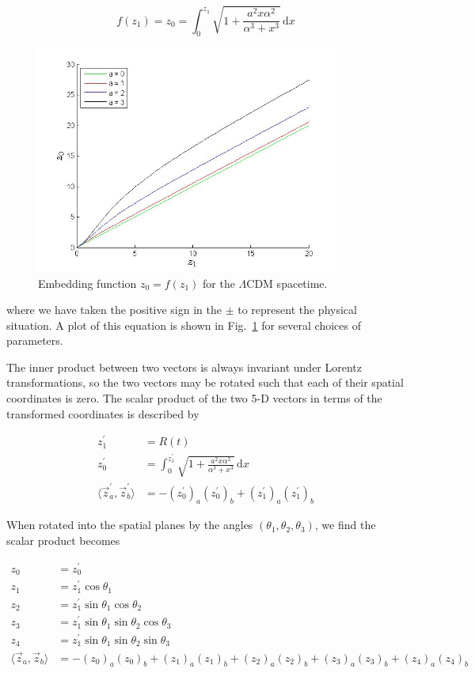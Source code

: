 \documentclass[preprint,notitlepage,amsmath,amssymb,floatfix]{revtex4-1}
\begin{document}
\begin{equation}
f\left(z_1\right) = z_0 = \int_0^{z_1}\!\sqrt{1+\frac{a^2x\alpha^2}{\alpha^3+x^3}}\,\mathrm dx
\end{equation}

\begin{figure}
\includegraphics[width=10cm]{figures/Embedding.jpg}
\caption{Embedding function $z_0 = f\left(z_1\right)$ for the $\Lambda$CDM spacetime.}
\label{fig:embedding}
\centering
\end{figure}

\noindent where we have taken the positive sign in the $\pm$ to represent the physical situation.  A plot of this equation is shown in Fig.~\ref{fig:embedding} for several choices of parameters. \par
The inner product between two vectors is always invariant under Lorentz transformations, so the two vectors may be rotated such that each of their spatial coordinates is zero.  
The scalar product of the two 5-D vectors in terms of the transformed coordinates is described by

\begin{align}
z^\prime_1 &= R\left(t\right) \\
z^\prime_0 &= \int_0^{z^\prime_1} \! \sqrt{1 + \frac{a^2x\alpha^2}{\alpha^3 + x^3}} \, \mathrm{d}x \\
\langle \vec{z}^\prime_a, \vec{z}^\prime_b \rangle &= -\left(z^\prime_0\right)_a \left(z^\prime_0\right)_b + \left(z^\prime_1\right)_a \left(z^\prime_1\right)_b
\end{align}

\noindent When rotated into the spatial planes by the angles $(\theta_1, \theta_2, \theta_3)$, we find the scalar product becomes 

\begin{align}
z_0 &= z^\prime_0 \\
z_1 &= z^\prime_1\cos\theta_1 \\
z_2 &= z^\prime_1\sin\theta_1\cos\theta_2 \\
z_3 &= z^\prime_1\sin\theta_1\sin\theta_2\cos\theta_3 \\
z_4 &= z^\prime_1\sin\theta_1\sin\theta_2\sin\theta_3 \\
\langle \vec{z}_a, \vec{z}_b \rangle &= -\left(z_0\right)_a\left(z_0\right)_b + \left(z_1\right)_a\left(z_1\right)_b + \left(z_2\right)_a\left(z_2\right)_b + \left(z_3\right)_a\left(z_3\right)_b + \left(z_4\right)_a\left(z_4\right)_b
\end{align}
\end{document}
